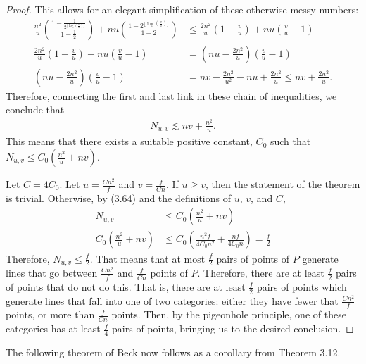 \documentclass{scrippsthesisclass}
\theoremstyle{definition}
\begin{document}
\begin{proof}
This allows for an elegant simplification of these otherwise messy numbers:
\begin{align}
    \frac{n^2}{u} \left( \frac{1 - \frac{1}{2^{\lfloor \log \left(\frac{v}{u} \right) \rfloor}}}{1 - \frac{1}{2}} \right) + nu \left(\frac{1 - 2^{\lfloor \log \left(\frac{v}{u} \right)\rfloor}}{1-2}\right) &\leq \frac{2n^2}{u} \left(1 - \frac{v}{u} \right) + nu \left(\frac{v}{u} - 1\right)\\
    \frac{2n^2}{u} \left(1 - \frac{v}{u} \right) + nu \left(\frac{v}{u} - 1\right) &= \left(nu - \frac{2n^2}{u} \right) \left(\frac{v}{u} - 1\right)\\
    \left(nu - \frac{2n^2}{u} \right) \left(\frac{v}{u} - 1\right) &= nv - \frac{2n^2}{u^2} - nu + \frac{2n^2}{u} \leq nv + \frac{2n^2}{u}.
\end{align}
Therefore, connecting the first and last link in these chain of inequalities, we conclude that 
\begin{align}
N_{u, v} \lesssim nv + \frac{n^2}{u}.
\end{align}
This means that there exists a suitable positive constant, $C_0$ such that $N_{u,v} \leq C_0 \left( \frac{n^2}{u} + nv\right)$. 

Let $C = 4C_0$. Let $u = \frac{Cn^2}{f}$ and $v = \frac{f}{Cn}$. 
If $u \geq v$, then the statement of the theorem is trivial. 
Otherwise, by (3.64) and the definitions of $u$, $v$, and $C$,
\begin{align}
    N_{u, v} &\leq C_0 \left(\frac{n^2}{u} + nv \right) \\
    C_0 \left(\frac{n^2}{u} + nv \right) & \leq C_0 \left(\frac{n^2 f}{4C_0 n^2} + \frac{nf}{4C_0n} \right) = \frac{f}{2}
\end{align}
Therefore, $N_{u,v} \leq \frac{f}{2}$. 
That means that at most $\frac{f}{2}$ pairs of points of $P$ generate lines that go between $\frac{Cn^2}{f}$ and $\frac{f}{Cn}$ points of $P$. 
Therefore, there are at least $\frac{f}{2}$ pairs of points that do not do this. 
That is, there are at least $\frac{f}{2}$ pairs of points which generate lines that fall into one of two categories: either they have fewer that $\frac{Cn^2}{f}$ points, or more than $\frac{f}{Cn}$ points. 
Then, by the pigeonhole principle, one of these categories has at least $\frac{f}{4}$ pairs of points, bringing us to the desired conclusion.
\end{proof}

The following theorem of Beck \cite{Beck} now follows as a corollary from Theorem 3.12. 
\end{document}
